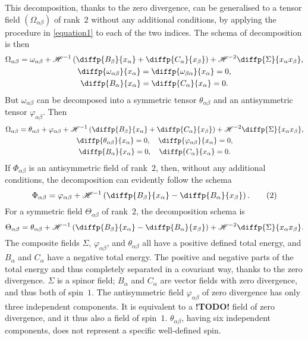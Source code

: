 \documentclass{article}
\newcommand{\HH}{\mathscr{H}}
\newcommand{\todo}{\textbf{ !TODO! }}
\newcommand{\oldpage}[1]{\marginpar{\footnotesize$\Big\vert$ \textit{p.~#1}}}
\begin{document}
This decomposition, thanks to the zero divergence, can be generalised to a tensor field $(\Omega_{\alpha\beta})$ of rank~$2$ without any additional conditions, by applying the procedure in \cref{equation1} to each of the two indices.
The schema of decomposition is then
\begin{gather*}
  \Omega_{\alpha\beta} = \omega_{\alpha\beta} + \HH^{-1}\left(
    \diffp{{B_\beta}}{{x_\alpha}} + \diffp{{C_\alpha}}{{x_\beta}}
  \right) + \HH^{-2}\diffp{\Sigma}{{{x_\alpha}}{{x_\beta}}},
\\\diffp{{\omega_{\alpha\beta}}}{{x_\alpha}} = \diffp{{\omega_{\beta\alpha}}}{{x_\alpha}} = 0,
\\\diffp{{B_\alpha}}{{x_\alpha}} = \diffp{{C_\alpha}}{{x_\alpha}} = 0.
\end{gather*}
But $\omega_{\alpha\beta}$ can be decomposed into a symmetric tensor $\theta_{\alpha\beta}$ and an antisymmetric tensor $\varphi_{\alpha\beta}$.
Then
\oldpage{13-04}
\begin{gather*}
  \Omega_{\alpha\beta} = \theta_{\alpha\beta} + \varphi_{\alpha\beta} + \HH^{-1}\left(
    \diffp{{B_\beta}}{{x_\alpha}} + \diffp{{C_\alpha}}{{x_\beta}}
  \right) + \HH^{-2}\diffp{\Sigma}{{x_\alpha}{x_\beta}},
\\\diffp{{\theta_{\alpha\beta}}}{{x_\alpha}} = 0,
  \quad \diffp{{\varphi_{\alpha\beta}}}{{x_\alpha}} = 0,
\\\diffp{{B_\alpha}}{{x_\alpha}} = 0,
  \quad \diffp{{C_\alpha}}{{x_\alpha}} = 0.
\end{gather*}
If $\Phi_{\alpha\beta}$ is an antisymmetric field of rank~$2$, then, without any additional conditions, the decomposition can evidently follow the schema
\[
\label{equation2}
  \Phi_{\alpha\beta} = \varphi_{\alpha\beta} + \HH^{-1}\left(
    \diffp{{B_\beta}}{{x_\alpha}} - \diffp{{B_\alpha}}{{x_\beta}}
  \right).
  \tag{2}
\]
For a symmetric field $\Theta_{\alpha\beta}$ of rank~$2$, the decomposition schema is
\[
  \Theta_{\alpha\beta} = \theta_{\alpha\beta} + \HH^{-1}\left(
    \diffp{{B_\beta}}{{x_\alpha}} - \diffp{{B_\alpha}}{{x_\beta}}
  \right) + \HH^{-2} \diffp{\Sigma}{{x_\alpha}{x_\beta}}.
\]
The composite fields $\Sigma$, $\varphi_{\alpha\beta}$, and $\theta_{\alpha\beta}$ all have a positive defined total energy, and $B_\alpha$ and $C_\alpha$ have a negative total energy.
The positive and negative parts of the total energy and thus completely separated in a covariant way, thanks to the zero divergence.
$\Sigma$ is a spinor field; $B_\alpha$ and $C_\alpha$ are vector fields with zero divergence, and thus both of spin~$1$.
The antisymmetric field $\varphi_{\alpha\beta}$ of zero divergence has only three independent components.
It is equivalent to a \todo field of zero divergence, and it thus also a field of spin~$1$.
$\theta_{\alpha\beta}$, having six independent components, does not represent a specific well-defined spin.
\end{document}
